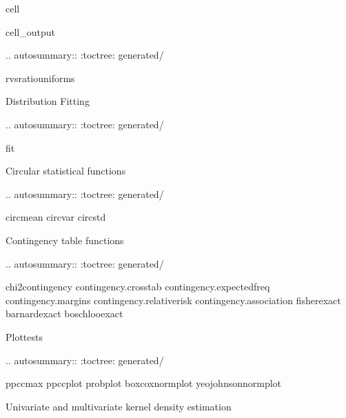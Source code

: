 \documentclass[letterpaper,10pt,english]{jupyterBook}
\begin{document}
\begin{sphinxuseclass}{cell}
\begin{sphinxVerbatimOutput}
\begin{sphinxuseclass}{cell_output}
\begin{sphinxVerbatim}[commandchars=\\\{\}]
.. autosummary::
   :toctree: generated/

   rvs\PYGZus{}ratio\PYGZus{}uniforms

Distribution Fitting
\PYGZhy{}\PYGZhy{}\PYGZhy{}\PYGZhy{}\PYGZhy{}\PYGZhy{}\PYGZhy{}\PYGZhy{}\PYGZhy{}\PYGZhy{}\PYGZhy{}\PYGZhy{}\PYGZhy{}\PYGZhy{}\PYGZhy{}\PYGZhy{}\PYGZhy{}\PYGZhy{}\PYGZhy{}\PYGZhy{}

.. autosummary::
   :toctree: generated/

   fit

Circular statistical functions
\PYGZhy{}\PYGZhy{}\PYGZhy{}\PYGZhy{}\PYGZhy{}\PYGZhy{}\PYGZhy{}\PYGZhy{}\PYGZhy{}\PYGZhy{}\PYGZhy{}\PYGZhy{}\PYGZhy{}\PYGZhy{}\PYGZhy{}\PYGZhy{}\PYGZhy{}\PYGZhy{}\PYGZhy{}\PYGZhy{}\PYGZhy{}\PYGZhy{}\PYGZhy{}\PYGZhy{}\PYGZhy{}\PYGZhy{}\PYGZhy{}\PYGZhy{}\PYGZhy{}\PYGZhy{}

.. autosummary::
   :toctree: generated/

   circmean
   circvar
   circstd

Contingency table functions
\PYGZhy{}\PYGZhy{}\PYGZhy{}\PYGZhy{}\PYGZhy{}\PYGZhy{}\PYGZhy{}\PYGZhy{}\PYGZhy{}\PYGZhy{}\PYGZhy{}\PYGZhy{}\PYGZhy{}\PYGZhy{}\PYGZhy{}\PYGZhy{}\PYGZhy{}\PYGZhy{}\PYGZhy{}\PYGZhy{}\PYGZhy{}\PYGZhy{}\PYGZhy{}\PYGZhy{}\PYGZhy{}\PYGZhy{}\PYGZhy{}

.. autosummary::
   :toctree: generated/

   chi2\PYGZus{}contingency
   contingency.crosstab
   contingency.expected\PYGZus{}freq
   contingency.margins
   contingency.relative\PYGZus{}risk
   contingency.association
   fisher\PYGZus{}exact
   barnard\PYGZus{}exact
   boschloo\PYGZus{}exact

Plot\PYGZhy{}tests
\PYGZhy{}\PYGZhy{}\PYGZhy{}\PYGZhy{}\PYGZhy{}\PYGZhy{}\PYGZhy{}\PYGZhy{}\PYGZhy{}\PYGZhy{}

.. autosummary::
   :toctree: generated/

   ppcc\PYGZus{}max
   ppcc\PYGZus{}plot
   probplot
   boxcox\PYGZus{}normplot
   yeojohnson\PYGZus{}normplot

Univariate and multivariate kernel density estimation
\PYGZhy{}\PYGZhy{}\PYGZhy{}\PYGZhy{}\PYGZhy{}\PYGZhy{}\PYGZhy{}\PYGZhy{}\PYGZhy{}\PYGZhy{}\PYGZhy{}\PYGZhy{}\PYGZhy{}\PYGZhy{}\PYGZhy{}\PYGZhy{}\PYGZhy{}\PYGZhy{}\PYGZhy{}\PYGZhy{}\PYGZhy{}\PYGZhy{}\PYGZhy{}\PYGZhy{}\PYGZhy{}\PYGZhy{}\PYGZhy{}\PYGZhy{}\PYGZhy{}\PYGZhy{}\PYGZhy{}\PYGZhy{}\PYGZhy{}\PYGZhy{}\PYGZhy{}\PYGZhy{}\PYGZhy{}\PYGZhy{}\PYGZhy{}\PYGZhy{}\PYGZhy{}\PYGZhy{}\PYGZhy{}\PYGZhy{}\PYGZhy{}\PYGZhy{}\PYGZhy{}\PYGZhy{}\PYGZhy{}\PYGZhy{}\PYGZhy{}\PYGZhy{}\PYGZhy{}


\end{sphinxVerbatim}
\end{sphinxuseclass}
\end{sphinxVerbatimOutput}
\end{sphinxuseclass}
\end{document}
